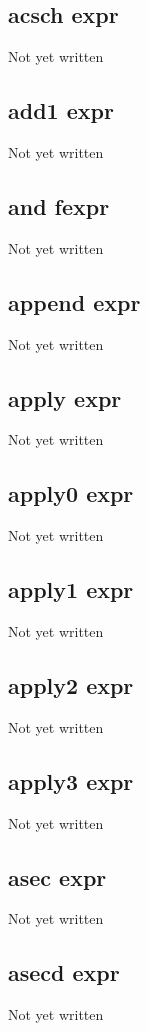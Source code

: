 \documentclass[a4paper,11pt]{article}
\begin{document}
{\subsection{\ttfamily acsch expr}
   Not yet written

\subsection{\ttfamily add1 expr}
   Not yet written

\subsection{\ttfamily and fexpr}
   Not yet written

\subsection{\ttfamily append expr}
   Not yet written

\subsection{\ttfamily apply expr}
   Not yet written

\subsection{\ttfamily apply0 expr}
   Not yet written

\subsection{\ttfamily apply1 expr}
   Not yet written

\subsection{\ttfamily apply2 expr}
   Not yet written

\subsection{\ttfamily apply3 expr}
   Not yet written

\subsection{\ttfamily asec expr}
   Not yet written

\subsection{\ttfamily asecd expr}
   Not yet written

}
\end{document}

